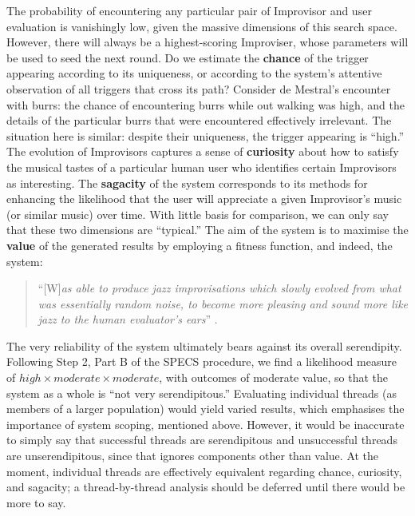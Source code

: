 The probability of encountering any particular pair of Improvisor and
user evaluation is vanishingly low, given the massive dimensions of
this search space.  However, there will always be a highest-scoring
Improviser, whose parameters will be used to seed the next round.  Do
we estimate the \textbf{chance} of the trigger appearing according to
its uniqueness, or according to the system's attentive observation of
all triggers that cross its path?  Consider de Mestral's encounter
with burrs: the chance of encountering burrs while out walking was
high, and the details of the particular burrs that were encountered
effectively irrelevant.  The situation here is similar: despite their
uniqueness, the trigger appearing is ``high.''  The evolution of
Improvisors captures a sense of \textbf{curiosity} about how to
satisfy the musical tastes of a particular human user who identifies
certain Improvisors as interesting.  The \textbf{sagacity} of the
system corresponds to its methods for enhancing the likelihood that
the user will appreciate a given Improvisor's music (or similar music)
over time.  With little basis for comparison, we can only say that
these two dimensions are ``typical.''  The aim of the system is to
maximise the \textbf{value} of the generated results by employing a
fitness function, and indeed, the system:
\begin{quote}
``{[}W{]}\emph{as able to produce jazz
improvisations which slowly evolved from what was essentially random
noise, to become more pleasing and sound more like jazz to the human
evaluator's ears}'' \cite{jordanous10}.
\end{quote}
The very reliability of the
system ultimately bears against its overall serendipity.  Following
Step 2, Part B of the SPECS procedure, we find a likelihood measure of
$\mathit{high}\times\mathit{moderate}\times\mathit{moderate}$, with
outcomes of moderate value, so that the system as a whole is ``not
very serendipitous.''  Evaluating individual threads (as members
of a larger population) would yield varied results, which
emphasises the importance of system scoping, mentioned above.
However, it would be inaccurate to simply say that successful threads are serendipitous and unsuccessful threads are unserendipitous,  since that ignores components other than value.  At the moment, individual threads are effectively equivalent regarding chance,
curiosity, and sagacity; a thread-by-thread analysis should be deferred until there would be more to say.


